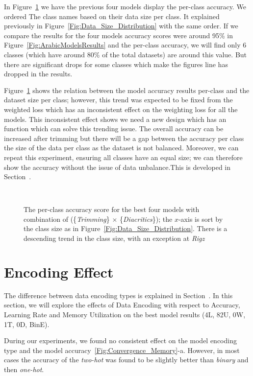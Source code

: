 In Figure~\ref{Fig:Results_Per_Class} we have the previous four models display the per-class accuracy. We ordered The class names based on their data size per class. It explained previously in Figure~\ref{Fig:Data_Size_Distribution} with the same order. If we compare the results for the four models accuracy scores were around 95\% in Figure~\ref{Fig:ArabicModelsResults} and the per-class accuracy, we will find only 6 classes (which have around 80\% of the total datasets) are around this value. But there are significant drops for some classes which make the figures line has dropped in the results.


Figure~\ref{Fig:Results_Per_Class} shows the relation between the model accuracy results per-class and the dataset size per class; however, this trend was expected to be fixed from the weighted loss which has an inconsistent effect on the weighting loss for all the models. This inconsistent effect shows we need a new design which has an function which can solve this trending issue. The overall accuracy can be increased after trimming but there will be a gap between the accuracy per class the size of the data per class as the dataset is not balanced. Moreover, we can repeat this experiment, ensuring all classes have an equal size; we can therefore show the accuracy without the issue of data unbalance.This is developed in Section~.


\begin{figure}[t]
	
	\caption{The per-class accuracy score for the best four models with combination of (\{\textit{Trimming}\} $\times$ \{\textit{Diacritics}\}); the $x$-axis is sort by the class size as in Figure~\ref{Fig:Data_Size_Distribution}. There is a descending trend in the class size, with an exception at \textit{Rigz}}~\label{Fig:Results_Per_Class}
\end{figure}
\clearpage
\section{Encoding Effect}


The difference between data encoding types is explained in Section~. 
In this section, we will explore the effects of Data Encoding with respect to Accuracy, Learning Rate and Memory Utilization on the best model results (4L, 82U, 0W, 1T, 0D, BinE). 

During our experiments, we found no consistent effect on the model encoding type and the model accuracy~\ref{Fig:Convergence_Memory}-a. However, in most cases the accuracy of the \textit{two-hot} was found to be slightly better than \textit{binary} and then \textit{one-hot}.

